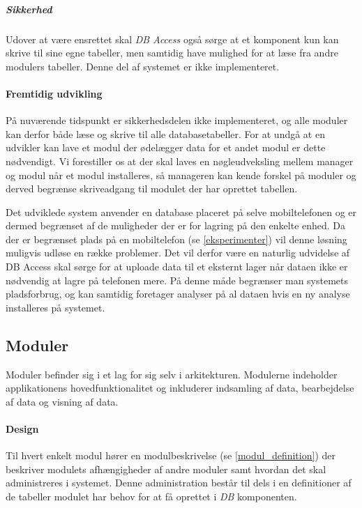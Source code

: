 \subparagraph{Sikkerhed}
Udover at være ensrettet skal \textit{DB Access} også sørge at et komponent kun kan skrive til sine egne tabeller, men samtidig have mulighed for at læse fra andre modulers tabeller.
Denne del af systemet er ikke implementeret.

\paragraph{Fremtidig udvikling}
På nuværende tidspunkt er sikkerhedsdelen ikke implementeret, og alle moduler kan derfor både læse og skrive til alle databasetabeller.
For at undgå at en udvikler kan lave et modul der ødelægger data for et andet modul er dette nødvendigt.
Vi forestiller os at der skal laves en nøgleudveksling mellem manager og modul når et modul installeres, så manageren kan kende forskel på moduler og derved begrænse skriveadgang til modulet der har oprettet tabellen.

Det udviklede system anvender en database placeret på selve mobiltelefonen og er dermed begrænset af de muligheder der er for lagring på den enkelte enhed.
Da der er begrænset plads på en mobiltelefon (se \cref{eksperimenter}) vil denne løsning muligvis udløse en række problemer.
Det vil derfor være en naturlig udvidelse af DB Access skal sørge for at uploade data til et eksternt lager når dataen ikke er nødvendig at lagre på telefonen mere.
På denne måde begrænser man systemets pladsforbrug, og kan samtidig foretager analyser på al dataen hvis en ny analyse installeres på systemet.

\subsection*{Moduler}
Moduler befinder sig i et lag for sig selv i arkitekturen.
Modulerne indeholder applikationens hovedfunktionalitet og inkluderer indsamling af data, bearbejdelse af data og visning af data.

\paragraph{Design}
Til hvert enkelt modul hører en modulbeskrivelse (se \cref{modul_definition}) der beskriver modulets afhængigheder af andre moduler samt hvordan det skal administreres i systemet.
Denne administration består til dels i en definitioner af de tabeller modulet har behov for at få oprettet i \textit{DB} komponenten.

